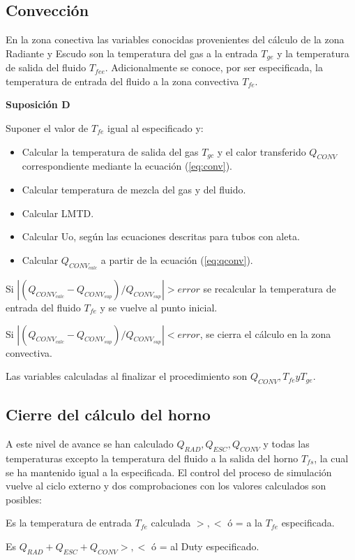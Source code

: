 \subsection{Convección}
\par En la zona conectiva las variables conocidas provenientes del cálculo de la zona Radiante y Escudo son la temperatura del gas a la entrada  $T_{ge}$ y la temperatura de salida del fluido $T_{fee}$. Adicionalmente se conoce, por ser especificada, la temperatura de entrada del fluido a la zona convectiva $T_{fe}$.
\par \textbf{Suposición D}
\par Suponer el valor de $T_{fe}$ igual al especificado y: 
\begin{itemize}
\item Calcular la temperatura de salida del gas $T_{gc}$ y el calor transferido $Q_{CONV}$ correspondiente mediante la ecuación (\ref{eq:conv}).
\item Calcular temperatura de mezcla del gas y del fluido.
\item Calcular LMTD.
\item Calcular Uo, según las ecuaciones descritas para tubos con aleta.
\item Calcular $Q_{CONV_{calc}}$ a partir de la ecuación (\ref{eq:qconv}).
\end{itemize}
\par Si $|(Q_{CONV_{calc}} - Q_{CONV_{sup}})/Q_{CONV_{sup}} | > error$ se recalcular la temperatura de entrada del fluido $T_{fe}$ y se vuelve al punto inicial.
\par Si $|(Q_{CONV_{calc}} - Q_{CONV_{sup}})/Q_{CONV_{sup}} | < error$, se cierra el cálculo en la zona convectiva.
\par Las variables calculadas al finalizar el procedimiento son  $Q_{CONV}, T_{fe} y T_{ge}$.

\subsection{Cierre del cálculo del horno}
\par A este nivel de avance se han calculado $Q_{RAD}, Q_{ESC}, Q_{CONV}$ y todas las temperaturas excepto la temperatura del fluido a la salida del horno $T_{fs}$, la cual se ha mantenido igual a la especificada. El control del proceso de simulación vuelve al ciclo externo y dos comprobaciones con los valores calculados son posibles:
\par Es la temperatura de entrada $T_{fe}$ calculada $>, <$ ó = a la $T_{fe}$ especificada.
\par Es $Q_{RAD} + Q_{ESC} + Q_{CONV} >, <$ ó = al Duty especificado.
 
